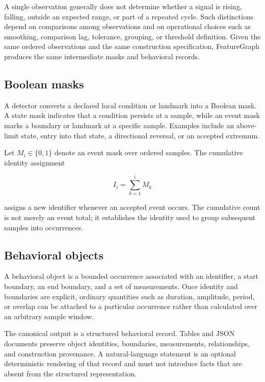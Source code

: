 A single observation generally does not determine whether a signal is rising, falling, outside an expected range, or part of a repeated cycle. Such distinctions depend on comparisons among observations and on operational choices such as smoothing, comparison lag, tolerance, grouping, or threshold definition. Given the same ordered observations and the same construction specification, FeatureGraph produces the same intermediate masks and behavioral records.

\subsection{Boolean masks}

A detector converts a declared local condition or landmark into a Boolean mask. A state mask indicates that a condition persists at a sample, while an event mask marks a boundary or landmark at a specific sample. Examples include an above-limit state, entry into that state, a directional reversal, or an accepted extremum.

Let $M_i \in \{0,1\}$ denote an event mask over ordered samples. The cumulative identity assignment

\begin{equation}
I_i = \sum_{k=1}^{i} M_k
\end{equation}

assigns a new identifier whenever an accepted event occurs. The cumulative count is not merely an event total; it establishes the identity used to group subsequent samples into occurrences.

\subsection{Behavioral objects}

A behavioral object is a bounded occurrence associated with an identifier, a start boundary, an end boundary, and a set of measurements. Once identity and boundaries are explicit, ordinary quantities such as duration, amplitude, period, or overlap can be attached to a particular occurrence rather than calculated over an arbitrary sample window.

The canonical output is a structured behavioral record. Tables and JSON documents preserve object identities, boundaries, measurements, relationships, and construction provenance. A natural-language statement is an optional deterministic rendering of that record and must not introduce facts that are absent from the structured representation.

